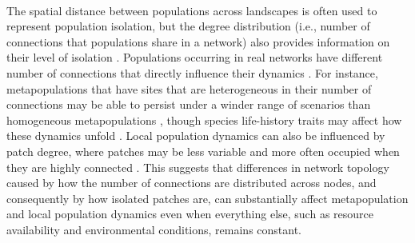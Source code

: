 
\paragraph*{}
The spatial distance between populations across landscapes is often used to represent population isolation, but the degree distribution (i.e., number of connections that populations share in a network) also provides information on their level of isolation \parencite{schmidt2020,arancibia2021}. Populations occurring in real networks have different number of connections that directly influence their dynamics \parencite{hanski1998, arancibia2024}. For instance, metapopulations that have sites that are heterogeneous in their number of connections may be able to persist under a winder range of scenarios than homogeneous metapopulations \parencite{artzy2010, grilli2015}, though species life-history traits may affect how these dynamics unfold \parencite{gilarranz2012}. Local population dynamics can also be influenced by patch degree, where patches may be less variable and more often occupied when they are highly connected \parencite{gilarranz2012, arancibia2024}. This suggests that differences in network topology caused by how the number of connections are distributed across nodes, and consequently by how isolated patches are, can substantially affect metapopulation and local population dynamics even when everything else, such as resource availability and environmental conditions, remains constant.

